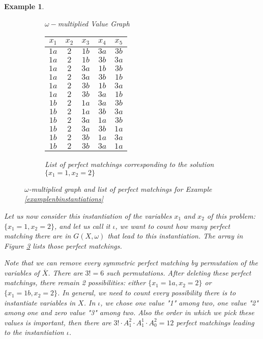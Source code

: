 \documentclass[jair,twoside,11pt,theapa]{article}
\newtheorem{example}[theorem]{Example}
\newcommand{\var}[1]{x_{#1}}
\begin{document}
\begin{example}
\begin{figure}
\begin{subfigure}{0.2\textwidth}
		\caption{$\omega-$multiplied Value Graph}
		\label{omvaluegraph2}
    \end{subfigure}
    \hspace{2cm}
    \begin{subfigure}{0.3\textwidth}
    \centering
		\begin{tabular}{ccccc}
		\hline
			$x_1$ & $x_2$ & $x_3$ & $x_4$ & $x_5$ \\
		\hline
			$1a$ & $2$ & $1b$ & $3a$ & $3b$ \\
			$1a$ & $2$ & $1b$ & $3b$ & $3a$ \\
			$1a$ & $2$ & $3a$ & $1b$ & $3b$ \\
			$1a$ & $2$ & $3a$ & $3b$ & $1b$ \\
			$1a$ & $2$ & $3b$ & $1b$ & $3a$ \\
			$1a$ & $2$ & $3b$ & $3a$ & $1b$ \\
			$1b$ & $2$ & $1a$ & $3a$ & $3b$ \\
			$1b$ & $2$ & $1a$ & $3b$ & $3a$ \\
			$1b$ & $2$ & $3a$ & $1a$ & $3b$ \\
			$1b$ & $2$ & $3a$ & $3b$ & $1a$ \\
			$1b$ & $2$ & $3b$ & $1a$ & $3a$ \\
			$1b$ & $2$ & $3b$ & $3a$ & $1a$ \\
		\hline
		\end{tabular}
		\caption{List of perfect matchings corresponding to the solution $\lbrace x_1=1, x_2=2 \rbrace$}
		\label{listperfectmatchingexample}
    \end{subfigure}
		\caption{$\omega$-multiplied graph and list of perfect matchings for Example \ref{examplenbinstantiations}}
\end{figure}
Let us now consider this instantiation of the variables $\var{1}$ and $\var{2}$ of this problem: $\lbrace x_1=1, x_2=2 \rbrace$, and let us call it $\iota$, we want to count how many perfect matching there are in $G(X, \omega)$ that lead to this instantiation. The array in Figure \ref{listperfectmatchingexample} lists those perfect matchings.
	 
Note that we can remove every symmetric perfect matching by permutation of the variables of $\overline{X}$. There are $3!=6$ such permutations. After deleting these perfect matchings, there remain 2 possibilities: either $\lbrace x_1=1a, x_2=2 \rbrace$ or $\lbrace x_1=1b, x_2=2 \rbrace$. In general, we need to count every possibility there is to instantiate variables in $X$. In $\iota$, we chose one value "1" among two, one value "2" among one and zero value "3" among two. Also the order in which we pick these values is important, then there are $3! \cdot A^2_1 \cdot A^1_1 \cdot A^2_0 = 12$  perfect matchings leading to the instantiation $\iota$.
\end{example}
\end{document}
